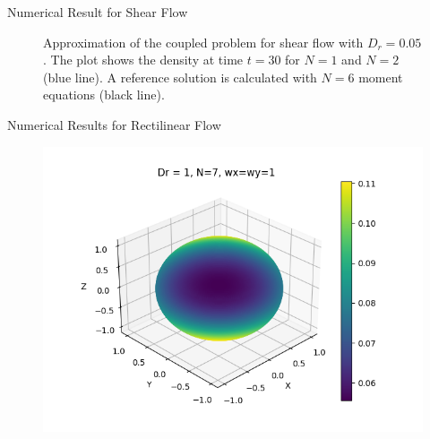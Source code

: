 \begin{frame}{Numerical Result for Shear Flow}
\begin{figure}
\begin{minipage}{0.46\textwidth}
			\end{minipage}
			\caption{Approximation of the coupled problem for shear flow with $D_r =0.05$. The plot shows the density at time $t=30$ for $N = 1$ and $N = 2$ (blue line). A reference solution is calculated with $N = 6$ moment equations (black line).}
			\label{ClusterFormation}
		\end{figure}
\end{frame}




\begin{frame}{Numerical Results for Rectilinear Flow}
		\scriptsize
		\begin{figure}[H]
			\centering
			\begin{minipage}{0.4\textwidth}
				\includegraphics[scale=0.23]{Bilder_wxwy/Sol_onSphere_wx=1=wy_Dr=1_N=7}
			\end{minipage}
			\hfill 
			\begin{minipage}{0.4\textwidth}

\end{minipage}
\end{figure}
\end{frame}
